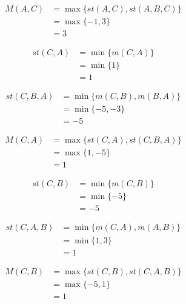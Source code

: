 \begin{align}
M (A, C)&=  \max \lbrace st (A, C), st(A, B, C) \rbrace \nonumber \\
                     &= \max \lbrace -1, 3 \rbrace \nonumber \\
                     &= 3\nonumber
\end{align}


\begin{align}
st (C, A)&=  \min \lbrace m (C, A) \rbrace  \nonumber \\
					  &= \min \lbrace 1 \rbrace  \nonumber \\
                     &= 1 \nonumber
\end{align}


\begin{align}
st (C, B, A)&= \min \lbrace m (C, B), m (B, A) \rbrace  \nonumber \\
                     &= \min \lbrace -5, -3 \rbrace \nonumber \\
                     &= -5\nonumber
\end{align}

\begin{align}
M (C, A)&=  \max \lbrace st (C, A), st(C, B, A) \rbrace \nonumber \\
                     &= \max \lbrace 1, -5 \rbrace \nonumber \\
                     &= 1\nonumber
\end{align}





\begin{align}
st (C, B)&=  \min \lbrace m (C, B) \rbrace  \nonumber \\
					  &= \min \lbrace -5 \rbrace  \nonumber \\
                     &= -5 \nonumber
\end{align}


\begin{align}
st (C, A, B)&= \min \lbrace m (C, A), m (A, B) \rbrace  \nonumber \\
                     &= \min \lbrace 1, 3\rbrace \nonumber \\
                     &= 1\nonumber
\end{align}

\begin{align}
M (C, B)&=  \max \lbrace st (C, B), st(C, A, B) \rbrace \nonumber \\
                     &= \max \lbrace -5, 1 \rbrace \nonumber \\
                     &= 1\nonumber
\end{align}


